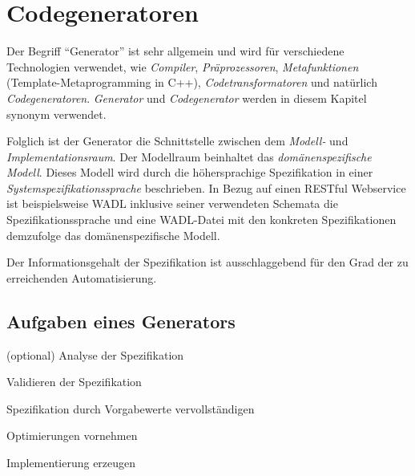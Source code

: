 \section{Codegeneratoren}


Der Begriff \enquote{Generator} ist sehr allgemein und wird für verschiedene Technologien verwendet, wie \emph{Compiler}, \emph{Präprozessoren}, \emph{Metafunktionen} (Template-Metaprogramming in C++), \emph{Codetransformatoren} und natürlich \emph{Codegeneratoren}. 
\emph{Generator} und \emph{Codegenerator} werden in diesem Kapitel synonym verwendet.


Folglich ist der Generator die Schnittstelle zwischen dem \emph{Modell-} und \emph{Implementationsraum}. Der Modellraum beinhaltet das \emph{domänenspezifische Modell}. Dieses Modell wird durch die höhersprachige Spezifikation in einer \emph{Systemspezifikationssprache} beschrieben. In Bezug auf einen \gls{RESTful} Webservice ist beispielsweise \gls{WADL} inklusive seiner verwendeten Schemata die Spezifikationssprache und eine \gls{WADL}-Datei mit den konkreten Spezifikationen demzufolge das domänenspezifische Modell.

Der Informationsgehalt der Spezifikation ist ausschlaggebend für den Grad der zu erreichenden Automatisierung.

\subsection{Aufgaben eines Generators}
\label{sec:generator_tasks}

\begin{compactenum}
    \item[{\footnotesize (optional)}] Analyse der Spezifikation
    \item Validieren der Spezifikation
    \item Spezifikation durch Vorgabewerte vervollständigen
    \item Optimierungen vornehmen
    \item Implementierung erzeugen
\end{compactenum}

